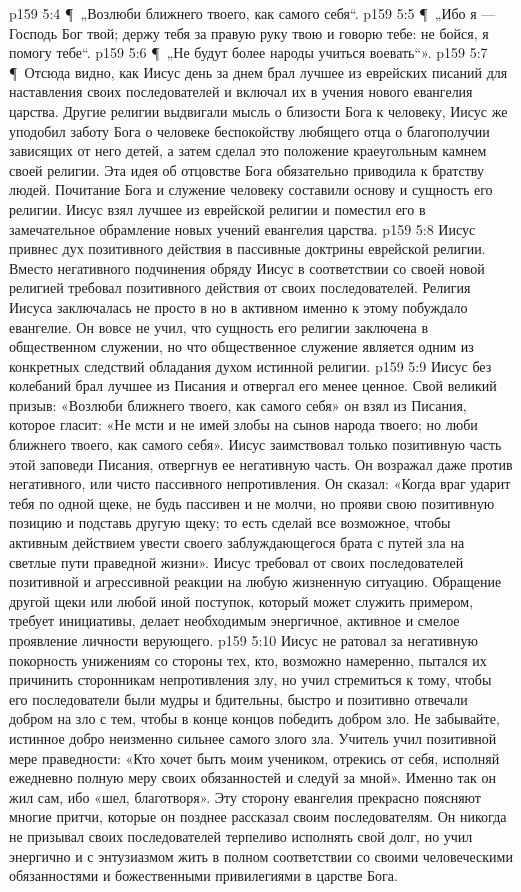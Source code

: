 \vs p159 5:4 \P\ „Возлюби ближнего твоего, как самого себя“.
\vs p159 5:5 \P\ „Ибо я --- Господь Бог твой; держу тебя за правую руку твою и говорю тебе: не бойся, я помогу тебе“.
\vs p159 5:6 \P\ „Не будут более народы учиться воевать“».
\vs p159 5:7 \P\ Отсюда видно, как Иисус день за днем брал лучшее из еврейских писаний для наставления своих последователей и включал их в учения нового евангелия царства. Другие религии выдвигали мысль о близости Бога к человеку, Иисус же уподобил заботу Бога о человеке беспокойству любящего отца о благополучии зависящих от него детей, а затем сделал это положение краеугольным камнем своей религии. Эта идея об отцовстве Бога обязательно приводила к братству людей. Почитание Бога и служение человеку составили основу и сущность его религии. Иисус взял лучшее из еврейской религии и поместил его в замечательное обрамление новых учений евангелия царства.
\vs p159 5:8 Иисус привнес дух позитивного действия в пассивные доктрины еврейской религии. Вместо негативного подчинения обряду Иисус в соответствии со своей новой религией требовал позитивного действия от своих последователей. Религия Иисуса заключалась не просто в  но в активном  именно к этому побуждало евангелие. Он вовсе не учил, что сущность его религии заключена в общественном служении, но что общественное служение является одним из конкретных следствий обладания духом истинной религии.
\vs p159 5:9 Иисус без колебаний брал лучшее из Писания и отвергал его менее ценное. Свой великий призыв: «Возлюби ближнего твоего, как самого себя» он взял из Писания, которое гласит: «Не мсти и не имей злобы на сынов народа твоего; но люби ближнего твоего, как самого себя». Иисус заимствовал только позитивную часть этой заповеди Писания, отвергнув ее негативную часть. Он возражал даже против негативного, или чисто пассивного непротивления. Он сказал: «Когда враг ударит тебя по одной щеке, не будь пассивен и не молчи, но прояви свою позитивную позицию и подставь другую щеку; то есть сделай все возможное, чтобы активным действием увести своего заблуждающегося брата с путей зла на светлые пути праведной жизни». Иисус требовал от своих последователей позитивной и агрессивной реакции на любую жизненную ситуацию. Обращение другой щеки или любой иной поступок, который может служить примером, требует инициативы, делает необходимым энергичное, активное и смелое проявление личности верующего.
\vs p159 5:10 Иисус не ратовал за негативную покорность унижениям со стороны тех, кто, возможно намеренно, пытался их причинить сторонникам непротивления злу, но учил стремиться к тому, чтобы его последователи были мудры и бдительны, быстро и позитивно отвечали добром на зло с тем, чтобы в конце концов победить добром зло. Не забывайте, истинное добро неизменно сильнее самого злого зла. Учитель учил позитивной мере праведности: «Кто хочет быть моим учеником, отрекись от себя, исполняй ежедневно полную меру своих обязанностей и следуй за мной». Именно так он жил сам, ибо «шел, благотворя». Эту сторону евангелия прекрасно поясняют многие притчи, которые он позднее рассказал своим последователям. Он никогда не призывал своих последователей терпеливо исполнять свой долг, но учил энергично и с энтузиазмом жить в полном соответствии со своими человеческими обязанностями и божественными привилегиями в царстве Бога.
